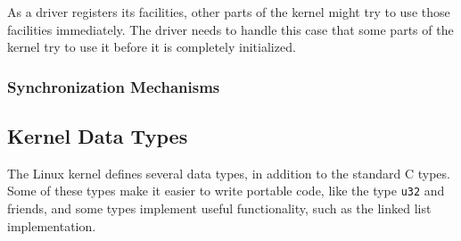 As a driver registers its facilities, other parts of the kernel might try to use those facilities immediately. The driver needs to handle this case that some parts of the kernel try to use it before it is completely initialized.

\subsubsection{Synchronization Mechanisms}\label{sec:synchronization-mechanisms}



\subsection{Kernel Data Types}\label{sec:kernel-data-types}
The Linux kernel defines several data types, in addition to the standard C types. Some of these types make it easier to write portable code, like the type \texttt{u32} and friends, and some types implement useful functionality, such as the linked list implementation.

